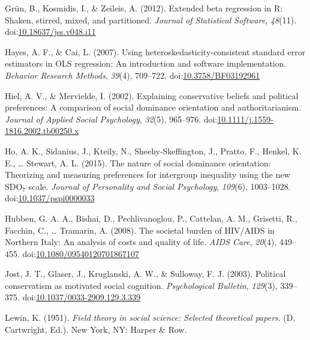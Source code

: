 \documentclass[english,,man]{apa6}
\begin{document}
\leavevmode\hypertarget{ref-grun2012extended}{}%
Grün, B., Kosmidis, I., \& Zeileis, A. (2012). Extended beta regression in R: Shaken, stirred, mixed, and partitioned. \emph{Journal of Statistical Software}, \emph{48}(11). doi:\href{https://doi.org/10.18637/jss.v048.i11}{10.18637/jss.v048.i11}

\leavevmode\hypertarget{ref-hayes2007using}{}%
Hayes, A. F., \& Cai, L. (2007). Using heteroskedasticity-consistent standard error estimators in OLS regression: An introduction and software implementation. \emph{Behavior Research Methods}, \emph{39}(4), 709--722. doi:\href{https://doi.org/10.3758/BF03192961}{10.3758/BF03192961}

\leavevmode\hypertarget{ref-hiel2002explaining}{}%
Hiel, A. V., \& Mervielde, I. (2002). Explaining conservative beliefs and political preferences: A comparison of social dominance orientation and authoritarianism. \emph{Journal of Applied Social Psychology}, \emph{32}(5), 965--976. doi:\href{https://doi.org/10.1111/j.1559-1816.2002.tb00250.x}{10.1111/j.1559-1816.2002.tb00250.x}

\leavevmode\hypertarget{ref-ho2015nature}{}%
Ho, A. K., Sidanius, J., Kteily, N., Sheehy-Skeffington, J., Pratto, F., Henkel, K. E., \ldots{} Stewart, A. L. (2015). The nature of social dominance orientation: Theorizing and measuring preferences for intergroup inequality using the new SDO\(_7\) scale. \emph{Journal of Personality and Social Psychology}, \emph{109}(6), 1003--1028. doi:\href{https://doi.org/10.1037/pspi0000033}{10.1037/pspi0000033}

\leavevmode\hypertarget{ref-hubben2008societal}{}%
Hubben, G. A. A., Bishai, D., Pechlivanoglou, P., Cattelan, A. M., Grisetti, R., Facchin, C., \ldots{} Tramarin, A. (2008). The societal burden of HIV/AIDS in Northern Italy: An analysis of costs and quality of life. \emph{AIDS Care}, \emph{20}(4), 449--455. doi:\href{https://doi.org/10.1080/09540120701867107}{10.1080/09540120701867107}

\leavevmode\hypertarget{ref-jost2003political}{}%
Jost, J. T., Glaser, J., Kruglanski, A. W., \& Sulloway, F. J. (2003). Political conservatism as motivated social cognition. \emph{Psychological Bulletin}, \emph{129}(3), 339--375. doi:\href{https://doi.org/10.1037/0033-2909.129.3.339}{10.1037/0033-2909.129.3.339}

\leavevmode\hypertarget{ref-lewin1951field}{}%
Lewin, K. (1951). \emph{Field theory in social science: Selected theoretical papers}. (D. Cartwright, Ed.). New York, NY: Harper \& Row.
\end{document}
